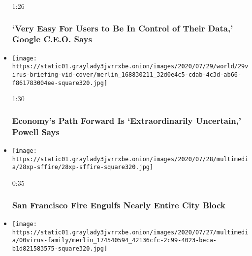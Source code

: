 \begin{itemize}
  1:26

  \hypertarget{very-easy-for-users-to-be-in-control-of-their-data-google-ceo-says}{%
  \subsubsection{`Very Easy For Users to Be In Control of Their Data,'
  Google C.E.O.
  Says}\label{very-easy-for-users-to-be-in-control-of-their-data-google-ceo-says}}
\item
  \href{https://www.nytimes3xbfgragh.onion/video/us/100000007262574/fed-powell-economy-coronavirus.html?action=click\&module=video-series-bar\&region=header\&pgtype=Article\&playlistId=video/u-s}{}

  \texttt{[image: https://static01.graylady3jvrrxbe.onion/images/2020/07/29/world/29virus-briefing-vid-cover/merlin\_168830211\_32d0e4c5-cdab-4c3d-ab66-f861783004ee-square320.jpg]}

  1:30

  \hypertarget{economys-path-forward-is-extraordinarily-uncertain-powell-says}{%
  \subsubsection{Economy's Path Forward Is `Extraordinarily Uncertain,'
  Powell
  Says}\label{economys-path-forward-is-extraordinarily-uncertain-powell-says}}
\item
  \href{https://www.nytimes3xbfgragh.onion/video/us/100000007260854/san-francisco-fire.html?action=click\&module=video-series-bar\&region=header\&pgtype=Article\&playlistId=video/u-s}{}

  \texttt{[image: https://static01.graylady3jvrrxbe.onion/images/2020/07/28/multimedia/28xp-sffire/28xp-sffire-square320.jpg]}

  0:35

  \hypertarget{san-francisco-fire-engulfs-nearly-entire-city-block}{%
  \subsubsection{San Francisco Fire Engulfs Nearly Entire City
  Block}\label{san-francisco-fire-engulfs-nearly-entire-city-block}}
\item
  \href{https://www.nytimes3xbfgragh.onion/video/us/100000007253343/coronavirus-houston-family.html?action=click\&module=video-series-bar\&region=header\&pgtype=Article\&playlistId=video/u-s}{}

  \texttt{[image: https://static01.graylady3jvrrxbe.onion/images/2020/07/27/multimedia/00virus-family/merlin\_174540594\_42136cfc-2c99-4023-beca-b1d821583575-square320.jpg]}


\end{itemize}

